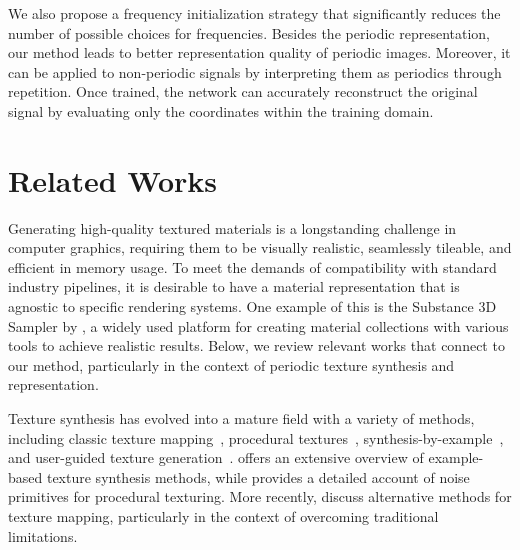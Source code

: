 We also propose a frequency initialization strategy that significantly reduces the number of possible choices for frequencies. Besides the periodic representation, our method leads to better representation quality of periodic images. Moreover, it can be applied to non-periodic signals by interpreting them as periodics through repetition. Once trained, the network can accurately reconstruct the original signal by evaluating only the coordinates within the training domain.

\section{Related Works}

Generating high-quality textured materials is a longstanding challenge in computer graphics, requiring them to be visually realistic, seamlessly tileable, and efficient in memory usage. To meet the demands of compatibility with standard industry pipelines, it is desirable to have a material representation that is agnostic to specific rendering systems. One example of this is the Substance 3D Sampler by \citet{substance_sampler}, a widely used platform for creating material collections with various tools to achieve realistic results. Below, we review relevant works that connect to our method, particularly in the context of periodic texture synthesis and representation.



Texture synthesis has evolved into a mature field with a variety of methods, including classic texture mapping~\citep{blinn76}, procedural textures~\citep{perlin-1985}, synthesis-by-example~\citep{efros99}, and user-guided texture generation~\citep{haeberli90}. \citet{pauly-2009} offers an extensive overview of example-based texture synthesis methods, while \citet{etal-2010} provides a detailed account of noise primitives for procedural texturing. More recently, \citet{rethinkngtex} discuss alternative methods for texture mapping, particularly in the context of overcoming traditional limitations.

